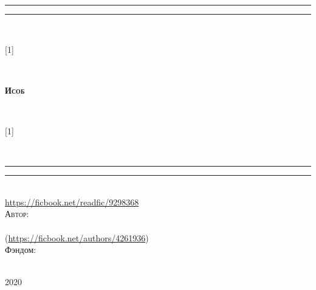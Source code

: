 

\begin{titlepage}
    {\begingroup
{}
\noindent
\endgroup}
\clearpage




	{\begingroup
    \centering %
    \vfill
    \parbox{\textwidth}{%
    \rule{\textwidth}{1.6pt}\vspace*{-\baselineskip}\vspace*{2pt} %
    \rule{\textwidth}{0.4pt}\\[0.2\baselineskip] %
    \parbox{\textwidth}{%
    \parbox[c][2cm][c]{2cm}{\scalebox{-1}[1]{}}
    ~ \hrulefill ~
    \parbox[c][2cm][c]{5cm}{\centering\textsc{\LARGE \textbf{Исоб}}}
     ~\hrulefill ~
    \parbox[c][2cm][c]{2cm}{\scalebox{-1}[1]{}}}\\[0.2\baselineskip] %
    \rule{\textwidth}{0.4pt}\vspace*{-\baselineskip}\vspace{3.2pt} %
    \rule{\textwidth}{1.6pt}}\\[2\baselineskip] %
    
    \href{https://ficbook.net/readfic/9298368}{https://ficbook.net/readfic/9298368} \\[0.5\baselineskip] %
    \vspace*{4\baselineskip} %
    {\scshape %
        Автор: \\[0.5\baselineskip]
        {\Large \authorfname} \\ [0.5\baselineskip]
    }
    (\href{https://ficbook.net/authors/4261936}{https://ficbook.net/authors/4261936}) \\
    
    \vfill \vfill
    {Фэндом: } %
    
   
    \vfill %
     \\[0.3\baselineskip] %
    {\scshape 2020} \\[0.3\baselineskip] %
    
    \endgroup}

    \centering
    
\end{titlepage}
